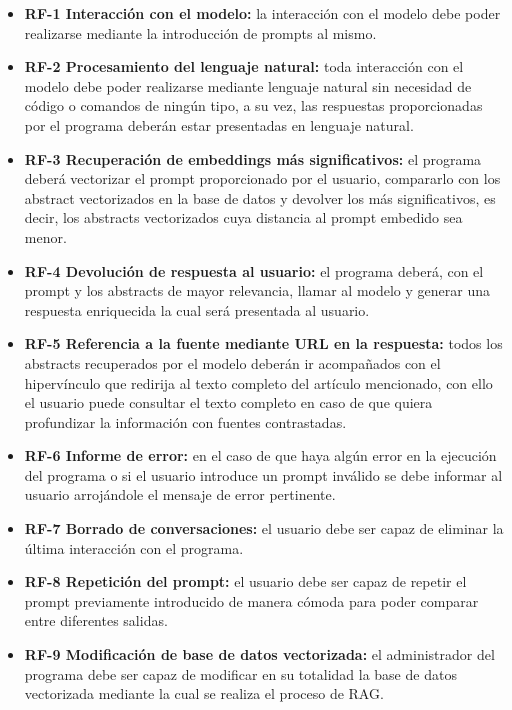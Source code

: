 \begin{itemize}
  \item \textbf{RF-1 Interacción con el modelo:} la interacción con el modelo debe poder realizarse mediante la introducción de prompts al mismo.
  
  \item \textbf{RF-2 Procesamiento del lenguaje natural:} toda interacción con el modelo debe poder realizarse mediante lenguaje natural sin necesidad de código o comandos de ningún tipo, a su vez, las respuestas proporcionadas por el programa deberán estar presentadas en lenguaje natural.
  
  \item \textbf{RF-3 Recuperación de embeddings más significativos:} el programa deberá vectorizar el prompt proporcionado por el usuario, compararlo con los abstract vectorizados en la base de datos y devolver los más significativos, es decir, los abstracts vectorizados cuya distancia al prompt embedido sea menor.
  
  \item \textbf{RF-4 Devolución de respuesta al usuario:} el programa deberá, con el prompt y los abstracts de mayor relevancia, llamar al modelo y generar una respuesta enriquecida la cual será presentada al usuario.
  
  \item \textbf{RF-5 Referencia a la fuente mediante URL en la respuesta:} todos los abstracts recuperados por el modelo deberán ir acompañados con el hipervínculo que redirija al texto completo del artículo mencionado, con ello el usuario puede consultar el texto completo en caso de que quiera profundizar la información con fuentes contrastadas.
  
  \item \textbf{RF-6 Informe de error:} en el caso de que haya algún error en la ejecución del programa o si el usuario introduce un prompt inválido se debe informar al usuario arrojándole el mensaje de error pertinente.
  
  \item \textbf{RF-7 Borrado de conversaciones:} el usuario debe ser capaz de eliminar la última interacción con el programa.
  
  \item \textbf{RF-8 Repetición del prompt:} el usuario debe ser capaz de repetir el prompt previamente introducido de manera cómoda para poder comparar entre diferentes salidas.
  
  \item \textbf{RF-9 Modificación de base de datos vectorizada:} el administrador del programa debe ser capaz de modificar en su totalidad la base de datos vectorizada mediante la cual se realiza el proceso de RAG.


\end{itemize}
